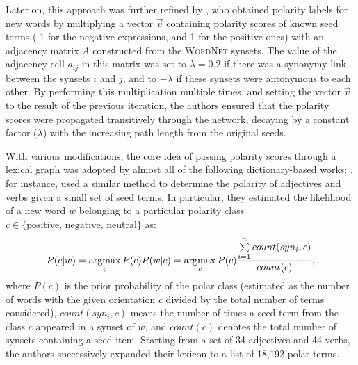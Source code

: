 Later on, this approach was further refined by
\citet{Blair-Goldensohn:08}, who obtained polarity labels for new
words by multiplying a vector $\vec{v}$ containing polarity scores of
known seed terms (-1 for the negative expressions, and 1 for the
positive ones) with an adjacency matrix $A$ constructed from the
\textsc{WordNet} synsets.  The value of the adjacency cell $a_{ij}$ in
this matrix was set to $\lambda=0.2$ if there was a synonymy link
between the synsets $i$ and $j$, and to $-\lambda$ if these synsets
were antonymous to each other.  By performing this multiplication
multiple times, and setting the vector $\vec{v}$ to the result of the
previous iteration, the authors ensured that the polarity scores were
propagated transitively through the network, decaying by a constant
factor ($\lambda$) with the increasing path length from the original
seeds.%

With various modifications, the core idea of passing polarity scores
through a lexical graph was adopted by almost all of the following
dictionary-based works: \citet{Kim:04,Kim:06}, for instance, used a
similar method to determine the polarity of adjectives and verbs given
a small set of seed terms.  In particular, they estimated the
likelihood of a new word $w$ belonging to a particular polarity class
$c \in \{\textrm{positive, negative, neutral}\}$ as:
\begin{equation*}
  P(c|w) = \argmax_{c}P(c)P(w|c) = \argmax_{c}P(c)\frac{\sum\limits_{i=1}^{n}count(syn_i, c)}{count(c)},
\end{equation*}
where $P(c)$ is the prior probability of the polar class (estimated as
the number of words with the given orientation $c$ divided by the
total number of terms considered), $count(syn_i, c)$ means the number
of times a seed term from the class $c$ appeared in a synset of $w$,
and $count(c)$ denotes the total number of synsets containing a seed
item.  Starting from a set of 34 adjectives and 44 verbs, the authors
successively expanded their lexicon to a list of 18,192 polar
terms. %

